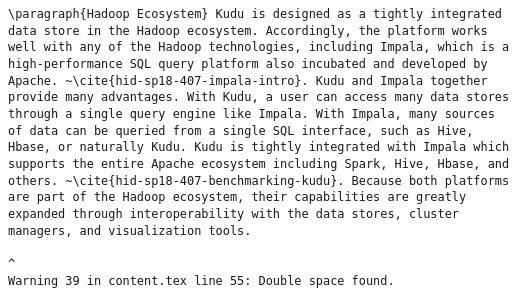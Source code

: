 \begin{tiny}
\begin{verbatim}
\paragraph{Hadoop Ecosystem} Kudu is designed as a tightly integrated data store in the Hadoop ecosystem. Accordingly, the platform works well with any of the Hadoop technologies, including Impala, which is a high-performance SQL query platform also incubated and developed by Apache. ~\cite{hid-sp18-407-impala-intro}. Kudu and Impala together provide many advantages. With Kudu, a user can access many data stores through a single query engine like Impala. With Impala, many sources of data can be queried from a single SQL interface, such as Hive, Hbase, or naturally Kudu. Kudu is tightly integrated with Impala which supports the entire Apache ecosystem including Spark, Hive, Hbase, and others. ~\cite{hid-sp18-407-benchmarking-kudu}. Because both platforms are part of the Hadoop ecosystem, their capabilities are greatly expanded through interoperability with the data stores, cluster managers, and visualization tools.  
                                                                                                                                                                                                                                                                                            ^
Warning 39 in content.tex line 55: Double space found.

\end{verbatim}
\end{tiny}
